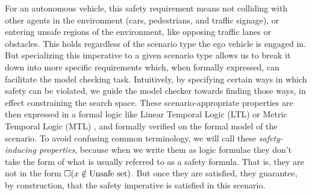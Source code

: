For an autonomous vehicle, this safety requirement means not colliding with other agents in the environment (cars, pedestrians, and traffic signage), or entering unsafe regions of the environment, like opposing traffic lanes or obstacles.
This holds regardless of the scenario type the ego vehicle is engaged in. 
But specializing this imperative to a given scenario type allows us to break it down into more specific requirements which, when formally expressed, can facilitate the model checking task.
Intuitively, by specifying certain ways in which safety can be violated, we guide the model checker towards finding those ways, in effect constraining the search space.
These scenario-appropriate properties are then expressed in a formal logic like Linear Temporal Logic (LTL) \cite{Pnueli77sfcs} or Metric Temporal Logic (MTL) \cite{Koymans90}, and formally verified on the formal model of the scenario.
To avoid confusing common terminology, we will call these \emph{safety-inducing properties}, because when we write them as logic formulae they don't take the form of what is usually referred to as a safety formula. 
That is, they are not in the form $\square (x \notin \text{Unsafe set})$.
But once they are satisfied, they guarantee, by construction, that the safety imperative is satisfied in this scenario.
